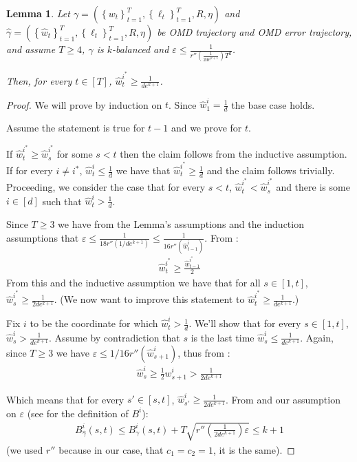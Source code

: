 \documentclass[10pt]{article}
\newtheorem{lemma}[theorem]{Lemma}
\theoremstyle{definition}
\theoremstyle{remark}
\renewcommand{\epsilon}{\varepsilon}
\newcommand{\curly}[1]{ {\left\{ #1 \right\}}}
\newcommand{\roundy}[1]{ {\left( #1 \right)}}
\newcommand{\squary}[1]{ {\left[ #1 \right]}}
\begin{document}
\begin{lemma}\label{lem:balance to bounded optimal arm}
Let $\gamma=(\curly{w_t}_{t=1}^T, \curly{\ell_t}_{t=1}^T, R, \eta)$ and $\hat{\gamma}=(\curly{\hat{w}_t}_{t=1}^T, \curly{\ell_t}_{t=1}^T, R, \eta)$ be OMD trajectory and OMD error trajectory, and assume $T\ge 4$, $\gamma$ is $k$-balanced and $\epsilon\le\frac{1}{r''\roundy{\frac{1}{2de^{k+1}}}T^2}$. 

Then, for every $t\in[T]$, $\hat{w}_t^{i^*} \ge \frac{1}{de^{k+1}}$.
\end{lemma}
\begin{proof}
We will prove by induction on $t$. Since $\hat{w}_1^i = \frac{1}{d}$ the base case holds.

Assume the statement is true for $t-1$ and we prove for $t$. 

If $\hat{w}_t^{i^*} \ge \hat{w}_s^{i^*}$ for some $s < t$ then the claim follows from the inductive assumption. If for every $i\ne i^*$, $\hat{w}_t^i \le \frac{1}{d}$ we have that $\hat{w}_t^{i^*} \ge \frac{1}{d}$ and the claim follows trivially. Proceeding, we consider the case that for every $s < t$, $\hat{w}_t^{i^*}< \hat{w}_s^{i^*}$ and there is some $i\in[d]$ such that $\hat{w}_t^i > \frac{1}{d}$.

Since $T\ge 3$ we have from the Lemma's assumptions and the induction assumptions that $\epsilon \le \frac{1}{18r''(1/de^{k+1})} \le \frac{1}{16r''(\hat{w}_{t-1}^i)}$. From :
\begin{align*}
    \hat{w}_{t}^{i^*}\ge \frac{\hat{w}_{t-1}^{i^*}}{2}
\end{align*}
From this and the inductive assumption we have that for all $s\in[1,t]$, $\hat{w}_s^{i^*} \ge \frac{1}{2de^{k+1}}$. (We now want to improve this statement to $\hat{w}_t^{i^*} \ge \frac{1}{de^{k+1}}$.)

Fix $i$ to be the coordinate for which $\hat{w}_t^i > \frac{1}{d}$. We'll show that for every $s\in[1,t]$, $\hat{w}_s^i > \frac{1}{de^{k+1}}$. Assume by contradiction that $s$ is the last time $\hat{w}_s^i \le \frac{1}{de^{k+1}}$. Again, since $T\ge 3$ we have $\epsilon \le 1/16r''(\hat{w}_{s+1}^i)$, thus from :
\begin{align*}
    \hat{w}_s^i \ge \frac{1}{2}w_{s+1}^i > \frac{1}{2de^{k+1}}
\end{align*}

Which means that for every $s'\in\squary{s,t}$, $\hat{w}_{s'}^i \ge \frac{1}{2de^{k+1}}$. From  and our assumption on $\epsilon$ (see  for the definition of $B^i$):
\begin{align*}
    B_{\hat{\gamma}}^i(s,t) \le B_{{\gamma}}^i(s,t) + T\sqrt{r''\roundy{\frac{1}{2de^{k+1}}}\epsilon} \le k+1
\end{align*}
(we used $r''$ because in our case, that $c_1=c_2=1$, it is the same).


\end{proof}
\end{document}
